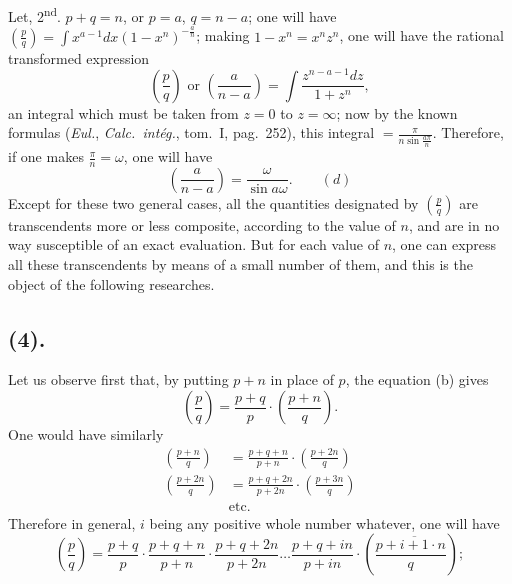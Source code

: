 \documentclass{article}
\begin{document}
Let, 2\textsuperscript{nd}. $p+q=n$, or $p=a$, $q=n-a$; one will have $\left(\frac{p}{q}\right)=\displaystyle\int x^{a-1}dx(1-x^{n})^{-\frac{a}{n}}$; making $1-x^{n}=x^{n}z^{n}$, one will have the rational transformed expression
\[ \left(\frac{p}{q}\right)\text{ or }\left(\frac{a}{n-a}\right)=\int\frac{z^{n-a-1}dz}{1+z^{n}}, \]
an integral which must be taken from $z=0$ to $z=\infty$; now by the known formulas (\emph{Eul.}, \emph{Calc.\ intég.}, tom.~I, pag.~252), this integral $=\frac{\pi}{n\sin\frac{a\pi}{n}}$. Therefore, if one makes $\frac{\pi}{n}=\omega$, one will have
\[ \left(\frac{a}{n-a}\right)=\frac{\omega}{\sin a\omega}.\qquad(d) \]
Except for these two general cases, all the quantities designated by $\left(\frac{p}{q}\right)$ are transcendents more or less composite, according to the value of $n$, and are in no way susceptible of an exact evaluation. But for each value of $n$, one can express all these transcendents by means of a small number of them, and this is the object of the following researches.

\subsection*{(4).}

Let us observe first that, by putting $p+n$ in place of $p$, the equation (b) gives
\[ \left(\frac{p}{q}\right)=\frac{p+q}{p}\cdot\left(\frac{p+n}{q}\right). \]
One would have similarly
\[ \begin{aligned} \left(\frac{p+n}{q}\right)&=\frac{p+q+n}{p+n}\cdot\left(\frac{p+2n}{q}\right)\\ \left(\frac{p+2n}{q}\right)&=\frac{p+q+2n}{p+2n}\cdot\left(\frac{p+3n}{q}\right)\\ &\text{etc.} \end{aligned} \]
Therefore in general, $i$ being any positive whole number whatever, one will have
\[ \left(\frac{p}{q}\right)=\frac{p+q}{p}\cdot\frac{p+q+n}{p+n}\cdot\frac{p+q+2n}{p+2n}\ldots\frac{p+q+in}{p+in}\cdot\left(\frac{p+\overline{i+1}\cdot n}{q}\right); \]
\end{document}
